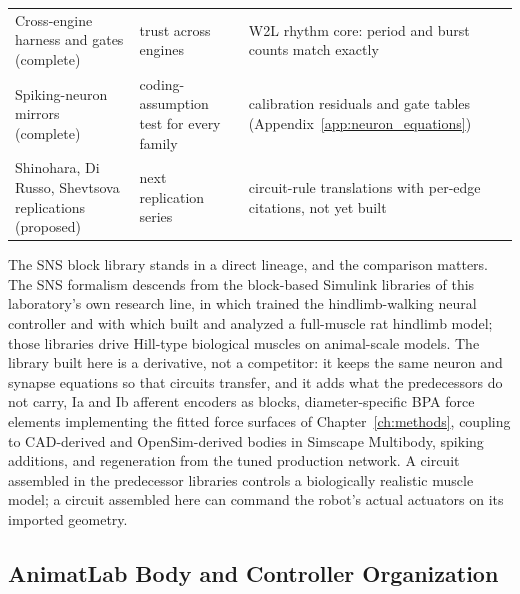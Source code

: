 \begin{table}[htbp]
\begin{tabularx}{\textwidth}{@{}>{\raggedright\arraybackslash}p{}>{\raggedright\arraybackslash}p{}>{\raggedright\arraybackslash}X@{}}
Cross-engine harness and gates (complete) & trust across engines & W2L rhythm core: period and burst counts match exactly \\
Spiking-neuron mirrors (complete) & coding-assumption test for every family & calibration residuals and gate tables (Appendix~\ref{app:neuron_equations}) \\
Shinohara, Di Russo, Shevtsova replications (proposed) & next replication series & circuit-rule translations with per-edge citations, not yet built \\
\bottomrule
\end{tabularx}
\end{table}

The SNS block library stands in a direct lineage, and the comparison matters. The SNS formalism descends from the block-based Simulink libraries of this laboratory's own research line, in which \citet{hunt_development_2017} trained the hindlimb-walking neural controller and with which \citet{young_analyzing_2019} built and analyzed a full-muscle rat hindlimb model; those libraries drive Hill-type biological muscles on animal-scale models. The library built here is a derivative, not a competitor: it keeps the same neuron and synapse equations so that circuits transfer, and it adds what the predecessors do not carry, Ia and Ib afferent encoders as blocks, diameter-specific BPA force elements implementing the fitted force surfaces of Chapter~\ref{ch:methods}, coupling to CAD-derived and OpenSim-derived bodies in Simscape Multibody, spiking additions, and regeneration from the tuned production network. A circuit assembled in the predecessor libraries controls a biologically realistic muscle model; a circuit assembled here can command the robot's actual actuators on its imported geometry.

\subsection{AnimatLab Body and Controller Organization}

